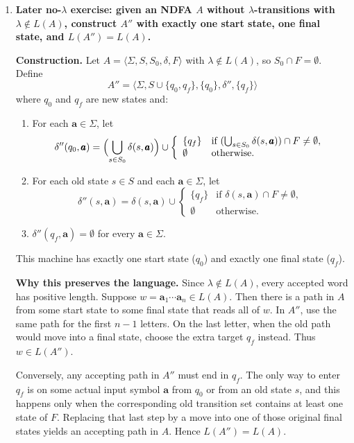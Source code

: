 \begin{enumerate}[{4.}1.]
\item \textbf{Later no-$\lambda$ exercise: given an NDFA $A$ without $\lambda$-transitions
with $\lambda\notin L(A)$, construct $A''$ with exactly one start state, one
final state, and $L(A'')=L(A)$.}

\textbf{Construction.}  Let $A=\langle\Sigma,S,S_0,\delta,F\rangle$ with
$\lambda\notin L(A)$, so $S_0\cap F=\emptyset$.  Define
\[
A''=\langle \Sigma,  S\cup\{q_0,q_f\},  \{q_0\},  \delta'',  \{q_f\}\rangle
\]
where $q_0$ and $q_f$ are new states and:
\begin{enumerate}[1.]
  \item For each $\pmb{a}\in\Sigma$, let
  \[
  \delta''(q_0,\pmb{a})=
  \Bigl(\bigcup_{s\in S_0}\delta(s,\pmb{a})\Bigr)\cup
  \left\{\begin{array}{ll}
  \{q_f\} & \text{if }(\bigcup_{s\in S_0}\delta(s,\pmb{a}))\cap F\neq\emptyset,\\
  \emptyset & \text{otherwise.}
  \end{array}\right.
  \]
  \item For each old state $s\in S$ and each $\pmb{a}\in\Sigma$, let
  \[
  \delta''(s,\pmb{a})=
  \delta(s,\pmb{a})\cup
  \left\{\begin{array}{ll}
  \{q_f\} & \text{if }\delta(s,\pmb{a})\cap F\neq\emptyset,\\
  \emptyset & \text{otherwise.}
  \end{array}\right.
  \]
  \item $\delta''(q_f,\pmb{a})=\emptyset$ for every $\pmb{a}\in\Sigma$.
\end{enumerate}

This machine has exactly one start state ($q_0$) and exactly one final state
($q_f$).

\textbf{Why this preserves the language.}  Since $\lambda\notin L(A)$, every
accepted word has positive length.  Suppose
$w=\pmb{a}_1\cdots \pmb{a}_n\in L(A)$.  Then there is a path in $A$ from some
start state to some final state that reads all of $w$.  In $A''$, use the same
path for the first $n-1$ letters.  On the last letter, when the old path would
move into a final state, choose the extra target $q_f$ instead.  Thus
$w\in L(A'')$.

Conversely, any accepting path in $A''$ must end in $q_f$.  The only way to
enter $q_f$ is on some actual input symbol $\pmb{a}$ from $q_0$ or from an old
state $s$, and this happens only when the corresponding old transition set
contains at least one state of $F$.  Replacing that last step by a move into
one of those original final states yields an accepting path in $A$.  Hence
$L(A'')=L(A)$.


\end{enumerate}
